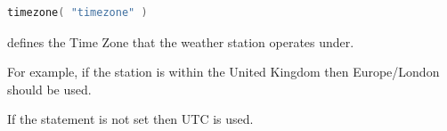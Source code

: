 \label{config:timezone}

\begin{lstlisting}[language=Go,style=kaolstplain]
timezone( "timezone" )
\end{lstlisting}

 defines the Time Zone that the weather station operates under.

For example, if the station is within the United Kingdom then Europe/London should be used.

If the  statement is not set then UTC is used.
